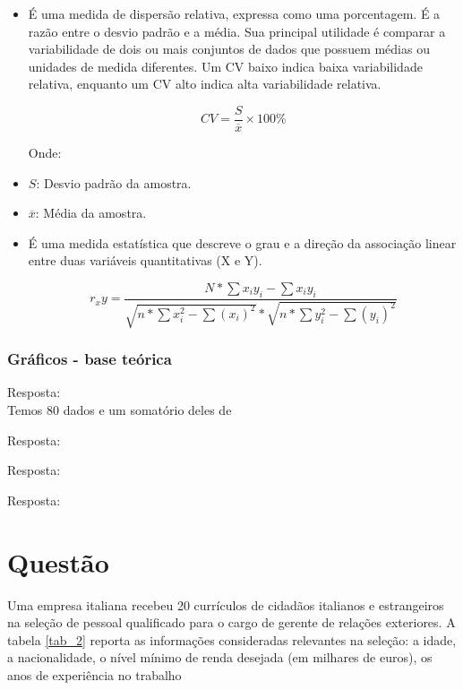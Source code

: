 \documentclass[a4paper,11pt]{article}
\begin{document}
\begin{itemize}
    \item É uma medida de dispersão relativa, expressa como uma porcentagem. É a razão entre o desvio padrão e a média. Sua principal utilidade é comparar a variabilidade de dois ou mais conjuntos de dados que possuem médias ou unidades de medida diferentes. Um CV baixo indica baixa variabilidade relativa, enquanto um CV alto indica alta variabilidade relativa.

    \[ CV = \frac{S}{\overline{x}} \times 100\% \]

    Onde:
    \item $S$: Desvio padrão da amostra.
    \item $\overline{x}$: Média da amostra.

    \item É uma medida estatística que descreve o grau e a direção da associação linear entre duas variáveis quantitativas (X e Y).

    \[r_xy = \frac{N*\sum{x_iy_i} - \sum{x_iy_i}}{\sqrt{n*\sum x_i^2 - \sum (x_i)^2} * \sqrt{n*\sum y_i^2 - \sum (y_i)^2}}\]

\end{itemize}

\subsubsection*{Gráficos - base teórica} 


\begin{description}[leftmargin=*]

\item[1.1] Resposta: \\

Temos 80 dados e um somatório deles de 

\item[1.2] Resposta: \\

\item[1.3] Resposta: \\

\item[1.4] Resposta: \\

\end{description}

\section{Questão} \label{sec:q2}
Uma empresa italiana recebeu 20 currículos de cidadãos italianos e estrangeiros na seleção
de pessoal qualificado para o cargo de gerente de relações exteriores. A tabela \ref{tab_2} reporta as
informações consideradas relevantes na seleção: a idade, a nacionalidade, o nível mínimo
de renda desejada (em milhares de euros), os anos de experiência no trabalho
\end{document}

